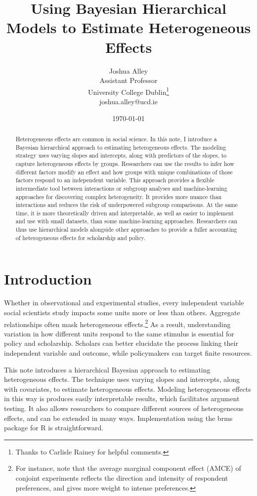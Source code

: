\documentclass[12pt]{article}
\title{\textbf{Using Bayesian Hierarchical Models to Estimate Heterogeneous Effects}}
\author{Joshua Alley \\
Assistant Professor \\
University College Dublin\thanks{Thanks to Carlisle Rainey for helpful comments.} \\
joshua.alley@ucd.ie
}
\date{\today}
\begin{document}
\maketitle 

\begin{abstract} 
Heterogeneous effects are common in social science. 
In this note, I introduce a Bayesian hierarchical approach to estimating heterogeneous effects. 
The modeling strategy uses varying slopes and intercepts, along with predictors of the slopes, to capture heterogeneous effects by groups.  
Researchers can use the results to infer how different factors modify an effect and how groups with unique combinations of those factors respond to an independent variable. 
This approach provides a flexible intermediate tool between interactions or subgroup analyses and machine-learning approaches for discovering complex heterogeneity. 
It provides more nuance than interactions and reduces the risk of underpowered subgroup comparisons.
At the same time, it is more theoretically driven and interpretable, as well as easier to implement and use with small datasets, than some machine-learning approaches. 
Researchers can thus use hierarchical models alongside other approaches to provide a fuller accounting of heterogeneous effects for scholarship and policy.
\end{abstract} 


\newpage 
\doublespace 


\section{Introduction}


Whether in observational and experimental studies, every independent variable social scientists study impacts some units more or less than others. 
Aggregate relationships often mask heterogeneous effects.\footnote{For instance, \citet{Abramsonetal2022} note that the average marginal component effect (AMCE) of conjoint experiments reflects the direction and intensity of respondent preferences, and gives more weight to intense preferences.} 
As a result, understanding variation in how different units respond to the same stimulus is essential for policy and scholarship. 
Scholars can better elucidate the process linking their independent variable and outcome, while policymakers can target finite resources. 



This note introduces a hierarchical Bayesian approach to estimating heterogeneous effects. 
The technique uses varying slopes and intercepts, along with covariates, to estimate heterogeneous effects. 
Modeling heterogeneous effects in this way is produces easily interpretable results, which facilitates argument testing. 
It also allows researchers to compare different sources of heterogeneous effects, and can be extended in many ways.  
Implementation using the brms package for \textsf{R} is straightforward. 
\end{document}
